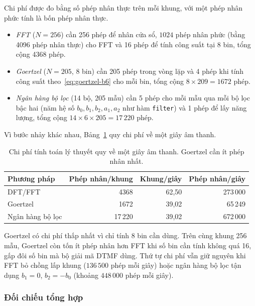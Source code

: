 \documentclass{dtmf_report}
\begin{document}
Chi phí được đo bằng số phép nhân thực trên mỗi khung, với một phép nhân phức tính
là bốn phép nhân thực.
\begin{itemize}
  \item \emph{FFT} ($N = 256$) cần 256 phép để nhân cửa sổ, $1024$ phép nhân phức
        (bằng 4096 phép nhân thực) cho FFT và 16 phép để tính công suất tại 8 bin,
        tổng cộng 4368 phép.
  \item \emph{Goertzel} ($N = 205$, 8 bin) cần 205 phép trong vòng lặp và 4 phép
        khi tính công suất theo~\eqref{eq:goertzel-b6} cho mỗi bin, tổng cộng
        $8 \times 209 = 1672$ phép.
  \item \emph{Ngân hàng bộ lọc} (14 bộ, 205 mẫu) cần 5 phép cho mỗi mẫu qua mỗi
        bộ lọc bậc hai (năm hệ số $b_{0}, b_{1}, b_{2}, a_{1}, a_{2}$ như hàm
        \texttt{filter}) và 1 phép để lấy năng lượng, tổng cộng
        $14 \times 6 \times 205 = 17\,220$ phép.
\end{itemize}

Vì bước nhảy khác nhau, Bảng~\ref{tab:chi-phi} quy chi phí về một giây âm thanh.

\begin{table}[H]
\centering
\caption{Chi phí tính toán lý thuyết quy về một giây âm thanh. Goertzel cần ít
phép nhân nhất.}
\label{tab:chi-phi}
\small
\begin{tabular}{l r r r}
\toprule
\textbf{Phương pháp} & \textbf{Phép nhân/khung} & \textbf{Khung/giây}
& \textbf{Phép nhân/giây} \\
\midrule
DFT/FFT          & 4368      & 62,50 & 273\,000 \\
Goertzel         & 1672      & 39,02 &  65\,249 \\
Ngân hàng bộ lọc & 17\,220   & 39,02 & 672\,000 \\
\bottomrule
\end{tabular}
\end{table}

Goertzel có chi phí thấp nhất vì chỉ tính 8 bin cần dùng. Trên cùng khung 256 mẫu,
Goertzel còn tốn ít phép nhân hơn FFT khi số bin cần tính không quá 16, gấp
đôi số bin mà bộ giải mã DTMF dùng.
Thứ tự chi phí vẫn giữ nguyên khi FFT bỏ chồng lấp khung ($136\,500$ phép mỗi giây)
hoặc ngân hàng bộ lọc tận dụng $b_{1} = 0$, $b_{2} = -b_{0}$ (khoảng $448\,000$ phép
mỗi giây).

\subsubsection{Đối chiếu tổng hợp}
\end{document}
